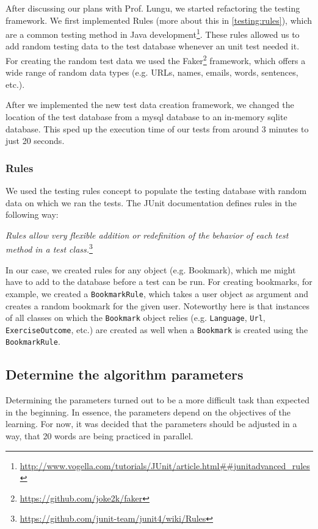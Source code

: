 \documentclass{article}
\begin{document}
After discussing our plans with Prof. Lungu, we started refactoring the testing framework. We first implemented Rules (more about this in \autoref{testing:rules}), which are a common testing method in Java development\footnote{\url{http://www.vogella.com/tutorials/JUnit/article.html##junitadvanced_rules}}. These rules allowed us to add random testing data to the test database whenever an unit test needed it. For creating the random test data we used the Faker\footnote{\url{https://github.com/joke2k/faker}} framework, which offers a wide range of random data types (e.g. URLs, names, emails, words, sentences, etc.). 

After we implemented the new test data creation framework, we changed the location of the test database from a mysql database to an in-memory sqlite database. This sped up the execution time of our tests from around 3 minutes to just 20 seconds. 

\subsubsection{Rules}\label{testing:rules}
We used the testing rules concept to populate the testing database with random data on which we ran the tests. The JUnit documentation defines rules in the following way:

\begin{displayquote}
\textit{Rules allow very flexible addition or redefinition of the behavior of each test method in a test class.}\footnote{\url{https://github.com/junit-team/junit4/wiki/Rules}}
\end{displayquote}

In our case, we created rules for any object (e.g. Bookmark), which me might have to add to the database before a test can be run. For creating bookmarks, for example, we created a \lstinline|BookmarkRule|, which takes a user object as argument and creates a random bookmark for the given user. Noteworthy here is that instances of all classes on which the \lstinline|Bookmark| object relies (e.g. \lstinline|Language|, \lstinline|Url|, \lstinline|ExerciseOutcome|, etc.) are created as well when a \lstinline|Bookmark| is created using the \lstinline|BookmarkRule|.

\subsection{Determine the algorithm parameters}
Determining the parameters turned out to be a more difficult task than expected in the beginning. In essence, the parameters depend on the objectives of the learning. For now, it was decided that the parameters should be adjusted in a way, that 20 words are being practiced in parallel.
\end{document}
